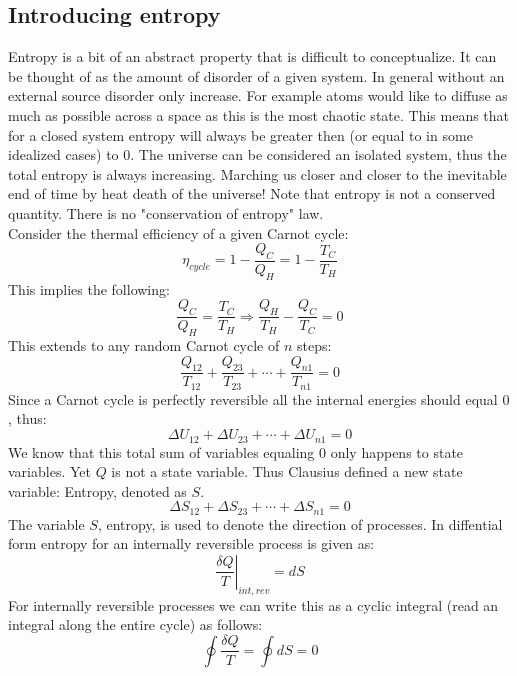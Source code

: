 \documentclass[11pt, a4paper]{article}
\begin{document}
\subsection{Introducing entropy}
Entropy is a bit of an abstract property that is difficult to conceptualize. It can be thought of as the amount of disorder of a given system. In general without an external source disorder only increase. For example atoms would like to diffuse as much as possible across a space as this is the most chaotic state. This means that for a closed system entropy will always be greater then (or equal to in some idealized cases) to $0$. The universe can be considered an isolated system, thus the total entropy is always increasing. Marching us closer and closer to the inevitable end of time by heat death of the universe! Note that entropy is not a conserved quantity. There is no "conservation of entropy" law.\\
Consider the thermal efficiency of a given Carnot cycle:
\begin{equation*}
  \eta_{cycle} = 1 - \frac{Q_C}{Q_H} = 1 - \frac{T_C}{T_H}
\end{equation*}
This implies the following:
\begin{equation*}
  \frac{Q_C}{Q_H} = \frac{T_C}{T_H} \Rightarrow \frac{Q_H}{T_H} - \frac{Q_C}{T_C} = 0
\end{equation*}
This extends to any random Carnot cycle of $n$ steps:
\begin{equation*}
  \frac{Q_{12}}{T_{12}} + \frac{Q_{23}}{T_{23}} + \cdots + \frac{Q_{n1}}{T_{n1}} = 0
\end{equation*}
Since a Carnot cycle is perfectly reversible all the internal energies should equal $0$, thus:
\begin{equation*}
  \Delta U_{12} + \Delta U_{23} + \cdots + \Delta U_{n1} = 0
\end{equation*}
We know that this total sum of variables equaling $0$ only happens to state variables. Yet $Q$ is not a state variable. Thus Clausius defined a new state variable: Entropy, denoted as $S$.
\begin{equation}
  \Delta S_{12} + \Delta S_{23} + \cdots + \Delta S_{n1} = 0
\end{equation}
The variable $S$, entropy, is used to denote the direction of processes. In diffential form entropy for an internally reversible process is given as:
\begin{equation}
  \left. \frac{\delta Q}{T} \right|_{int,rev} = dS
\end{equation}
For internally reversible processes we can write this as a cyclic integral (read an integral along the entire cycle) as follows:
\begin{equation}
  \oint \frac{\delta Q}{T} = \oint dS = 0
\end{equation}
\end{document}
